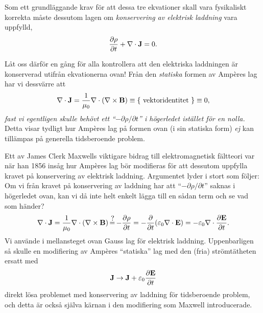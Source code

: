 Som ett grundl{\"a}ggande krav f{\"o}r att dessa tre ekvationer skall vara
fysikaliskt korrekta m{\aa}ste dessutom lagen om {\it konservering av elektrisk
laddning} vara uppfylld,
$$
  {{\partial\rho}\over{\partial t}}+\nabla\cdot{\bf J}=0.
$$
\smallskip
\centerline{}
\medskip
\noindent
L{\aa}t oss d{\"a}rf{\"o}r en g{\aa}ng f{\"o}r alla kontrollera att den
elektriska laddningen {\"a}r konserverad utifr{\aa}n ekvationerna ovan!
Fr{\aa}n den {\it statiska} formen av Amp\`eres lag har vi dessv{\"a}rre att
$$
  \nabla\cdot{\bf J}
    = {{1}\over{\mu_0}}\nabla\cdot(\nabla\times{\bf B})
    \equiv \{\ \hbox{vektoridentitet}\ \}
    \equiv 0,
$$
{\it fast vi egentligen skulle beh{\"o}vt ett ``$-\partial\rho/\partial t$'' i
h{\"o}gerledet ist{\"a}llet f{\"o}r en nolla.} Detta visar tydligt hur Amp\`eres
lag p{\aa} formen ovan (i sin statiska form) {\it ej} kan till{\"a}mpas p{\aa}
generella tidsberoende problem.

Ett av James Clerk Maxwells viktigare bidrag till elektromagnetisk f{\"a}ltteori
var n{\"a}r han 1856 ins{\aa}g hur Amp\`eres lag b{\"o}r modifieras f{\"o}r att
dessutom uppfylla kravet p{\aa} konservering av elektrisk laddning. Argumentet
lyder i stort som f{\"o}ljer: Om vi fr{\aa}n kravet p{\aa} konservering av
laddning har att ``$-\partial\rho/\partial t$'' saknas i h{\"o}gerledet ovan,
kan vi d{\aa} inte helt enkelt l{\"a}gga till en s{\aa}dan term och se vad som
h{\"a}nder?
$$
    \nabla\cdot{\bf J}
       = {{1}\over{\mu_0}}\nabla\cdot(\nabla\times{\bf B})
       \eqq -{{\partial\rho}\over{\partial t}}
       = -{{\partial}\over{\partial t}}(\varepsilon_0\nabla\cdot{\bf E})
       = -\varepsilon_0\nabla\cdot{{\partial{\bf E}}\over{\partial t}}.
$$
Vi anv{\"a}nde i mellansteget ovan Gauss lag f{\"o}r elektrisk laddning.
Uppenbarligen s{\aa} skulle en modifiering av Amp\`eres ``statiska'' lag med
den (fria) str{\"o}mt{\"a}theten ersatt med
$$
  {\bf J}\to{\bf J}+\varepsilon_0{{\partial{\bf E}}\over{\partial t}}
$$
direkt l{\"o}sa problemet med konservering av laddning f{\"o}r tidsberoende
problem, och detta {\"a}r ocks{\aa} sj{\"a}lva k{\"a}rnan i den modifiering
som Maxwell introducerade.

